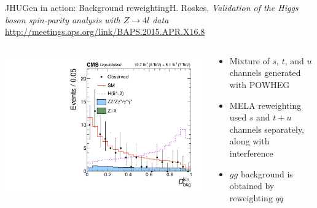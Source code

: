 \documentclass[usenames,dvipsnames,svgnames,table]{beamer}
\begin{document}
\begin{frame}{JHUGen in action: Background reweighting}{H. Roskes, \emph{Validation of the Higgs boson spin-parity
analysis with $Z\to 4l$ data}\\ \url{http://meetings.aps.org/link/BAPS.2015.APR.X16.8}}
\begin{columns}
\begin{column}{0.55\textwidth}
\includegraphics[width=.5\columnwidth]{HVV/Z4lDbkgkin}
\end{column}
\begin{column}{0.45\textwidth}
\begin{itemize}
\item Mixture of $s$, $t$, and $u$ channels generated with POWHEG
\item MELA reweighting used $s$ and $t+u$ channels separately, along with interference
\item $gg$ background is obtained by reweighting $q\bar{q}$
\end{itemize}
\end{column}
\end{columns}
\end{frame}
\end{document}
